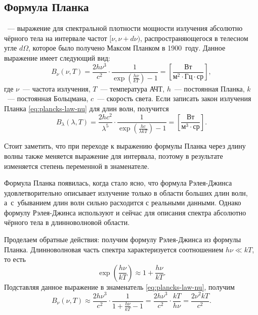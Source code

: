 \subsection{Формула Планка}
\label{sec:planck-law}
~--- выражение для спектральной плотности мощности излучения
 абсолютно чёрного тела на интервале частот $[\nu, \nu + d \nu)$,
 распространяющегося в телесном угле $d\Omega$, которое было получено Максом
 Планком в 1900~году. Данное выражение имеет следующий вид:
\begin{equation}
    B_\nu(\nu,T)
    = \frac{2h\nu^3}{c^2}\cdot \frac{1}{\exp\left(\frac{h\nu}{kT}\right)-1}
    = \left[ \frac{\text{Вт}}{\text{м}^2 \cdot \text{Гц} \cdot \text{ср}}\right],
    \label{eq:plancks-law-nu}
\end{equation}
где $\nu$~--- частота излучения, $T$~--- температура АЧТ, $h$~--- постоянная
 Планка, $k$~--- постоянная Больцмана, $c$~--- скорость света. Если записать закон
 излучения Планка \eqref{eq:plancks-law-nu} для длин волн, получится
\begin{equation}
    B_\lambda(\lambda,T)
    = \frac{2hc^2}{\lambda^5} \cdot \frac{1}{\exp\left(\frac{hc}{\lambda kT}\right)-1}
    = \left[ \frac{\text{Вт}}{\text{м}^3 \cdot \text{ср}}\right].
    \label{eq:plancks-law-lambda}
\end{equation}

Стоит заметить, что при переходе к выражению формулы Планка через длину
 волны также меняется выражение для интервала, поэтому в результате 
 изменяется степень переменной в знаменателе.

Формула Планка появилась, когда стало ясно, что формула Рэлея-Джинса
 удовлетворительно описывает излучение только в области больших длин волн,
 а~с~убыванием длин волн сильно расходится с реальными данными. Однако формулу
 Рэлея-Джинса используют и сейчас для описания спектра абсолютно чёрного тела 
 в длинноволновой области.


Проделаем обратные действия: получим формулу Рэлея-Джинса из формулы Планка. Длинноволновая часть спектра характеризуется соотношением $h\nu \ll kT$, то есть
\begin{equation*}
    \exp\left( \frac{h\nu}{kT}\right) \approx 1 + \frac{h\nu}{kT}.
\end{equation*}
Подставляя данное выражение в знаменатель \eqref{eq:plancks-law-nu}, получим
\begin{equation*}
    B_\nu(\nu,T)
    \approx \frac{2h\nu^3}{c^2}\cdot \frac{1}{1 + \frac{h\nu}{kT} - 1}
    = \frac{2h\nu^3 }{c^2}\cdot \frac{k T}{ h \nu}
    = \frac{2 \nu^2 k T}{c^2}.
\end{equation*}

